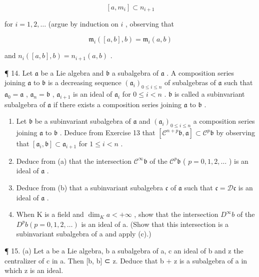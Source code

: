 \[
[ a, m _ {i} ] \subset n _ {i + 1}
\]

for \(i = 1,2,\ldots\) (argue by induction on \(i\) , observing that

\[
\mathfrak {m} _ {i} ([ a, b ], b) = \mathfrak {m} _ {i} (a, b)
\]

and \(n_{i}([a,b],b)=n_{i+1}(a,b)\) .

¶ 14. Let \(\mathfrak{a}\) be a Lie algebra and \(\mathfrak{b}\) a subalgebra of \(\mathfrak{a}\) . A composition series joining \(\mathfrak{a}\) to \(\mathfrak{b}\) is a decreasing sequence \((\mathfrak{a}_i)_{0\leqslant i\leqslant n}\) of subalgebras of \(\mathfrak{a}\) such that \(\mathfrak{a}_0 = \mathfrak{a}\) , \(\mathfrak{a}_n = \mathfrak{b}\) , \(\mathfrak{a}_{i+1}\) is an ideal of \(\mathfrak{a}_i\) for \(0\leqslant i < n\) . \(\mathfrak{b}\) is called a subinvariant subalgebra of \(\mathfrak{a}\) if there exists a composition series joining \(\mathfrak{a}\) to \(\mathfrak{b}\) .

\begin{enumerate}
\def\labelenumi{(\alph{enumi})}
\item
  Let \(\mathfrak{b}\) be a subinvariant subalgebra of \(\mathfrak{a}\) and \((\mathfrak{a}_i)_{0\leqslant i\leqslant n}\) a composition series joining \(\mathfrak{a}\) to \(\mathfrak{b}\) . Deduce from Exercise 13 that \([\mathcal{C}^{n+p}\mathfrak{b},\mathfrak{a}]\subset\mathcal{C}^{p}\mathfrak{b}\) by observing that \([\mathfrak{a}_i,\mathfrak{b}]\subset\mathfrak{a}_{i+1}\) for \(1\leqslant i<n\) .
\item
  Deduce from (a) that the intersection \(\mathcal{C}^{\infty}\mathfrak{b}\) of the \(\mathcal{C}^{p}\mathfrak{b}\) ( \(p = 0,1,2,\ldots\) ) is an ideal of \(\mathfrak{a}\) .
\item
  Deduce from (b) that a subinvariant subalgebra \(\mathfrak{c}\) of \(\mathfrak{a}\) such that \(\mathfrak{c} = \mathcal{D}\mathfrak{c}\) is an ideal of \(\mathfrak{a}\) .
\item
  When K is a field and \(\dim_{K}a<+\infty\) , show that the intersection \(D^{\infty}b\) of the \(D^{p}b\left(p=0,1,2,\ldots\right)\) is an ideal of a. (Show that this intersection is a subinvariant subalgebra of a and apply (c).)
\end{enumerate}

¶ 15. (a) Let a be a Lie algebra, b a subalgebra of a, c an ideal of b and z the centralizer of c in a. Then {[}b, b{]} ⊂ z. Deduce that b + z is a subalgebra of a in which z is an ideal.

